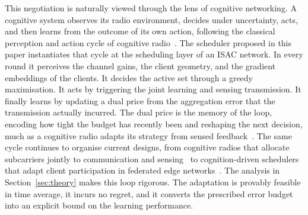 \documentclass[lettersize,journal]{IEEEtran}
\begin{document}
This negotiation is naturally viewed through the lens of cognitive networking. A cognitive system observes its radio environment, decides under uncertainty, acts, and then learns from the outcome of its own action, following the classical perception and action cycle of cognitive radio~\cite{mitola1999,haykin2005}. The scheduler proposed in this paper instantiates that cycle at the scheduling layer of an ISAC network. In every round it perceives the channel gains, the client geometry, and the gradient embeddings of the clients. It decides the active set through a greedy maximisation. It acts by triggering the joint learning and sensing transmission. It finally learns by updating a dual price from the aggregation error that the transmission actually incurred. The dual price is the memory of the loop, encoding how tight the budget has recently been and reshaping the next decision, much as a cognitive radio adapts its strategy from sensed feedback~\cite{bkassiny2013}. The same cycle continues to organise current designs, from cognitive radios that allocate subcarriers jointly to communication and sensing~\cite{galappaththige2026} to cognition-driven schedulers that adapt client participation in federated edge networks~\cite{lai2026cognition}. The analysis in Section~\ref{sec:theory} makes this loop rigorous. The adaptation is provably feasible in time average, it incurs no regret, and it converts the prescribed error budget into an explicit bound on the learning performance.
\end{document}
